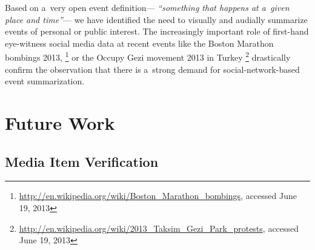 Based on a~very open event definition---%
\textit{``something that happens at a~given place and time''}---%
we have identified the need to
visually and audially summarize events
of personal or public interest.
The increasingly important role of first-hand eye-witness
social media data at recent events like the
Boston Marathon bombings 2013,%
\footnote{\url{http://en.wikipedia.org/wiki/Boston_Marathon_bombings}, accessed June 19, 2013}
or the Occupy Gezi movement 2013 in Turkey%
\footnote{\url{http://en.wikipedia.org/wiki/2013_Taksim_Gezi_Park_protests}, accessed June 19, 2013}
drastically confirm the observation that there is a~strong demand
for social-network-based event summarization.

\section{Future Work}

\subsection{Media Item Verification}

